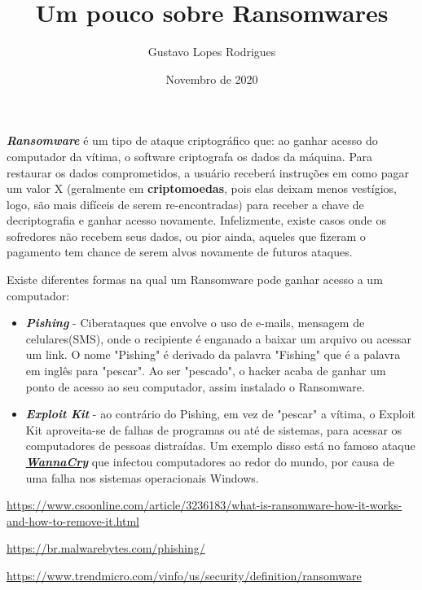 \documentclass[12pt]{article}
\title{\textbf{Um pouco sobre Ransomwares}}
\author{Gustavo Lopes Rodrigues}
\date{Novembro de 2020}
\begin{document}
    
    \maketitle

    \textbf{\emph{Ransomware}} é um tipo de ataque criptográfico
    que: ao ganhar acesso do computador da vítima, o software 
    criptografa os dados da máquina. Para restaurar os dados comprometidos,
    a usuário receberá instruções em como pagar um valor X
    (geralmente em \textbf{criptomoedas}, pois elas deixam menos 
    vestígios, logo, são mais difíceis de serem re-encontradas) 
    para receber a chave de decriptografia e ganhar acesso novamente. 
    Infelizmente, existe casos onde os sofredores não recebem seus dados, 
    ou pior ainda, aqueles que fizeram o pagamento tem chance de
    serem alvos novamente de futuros ataques.

    Existe diferentes formas na qual um Ransomware pode ganhar 
    acesso a um computador:

    \begin{itemize}
        \item \textbf{\emph{Pishing}} - Ciberataques que envolve
        o uso de e-mails, mensagem de celulares(SMS), onde o recipiente
        é enganado a baixar um arquivo ou acessar um link. O nome "Pishing" é 
        derivado da palavra "Fishing" que é a palavra em inglês para "pescar".
        Ao ser "pescado", o hacker acaba de ganhar um ponto de acesso ao seu 
        computador, assim instalado o Ransomware.
    
        \item \textbf{\emph{Exploit Kit}} - ao contrário do Pishing, em vez
        de "pescar" a vítima, o Exploit Kit aproveita-se de falhas de programas
        ou até de sistemas, para acessar os computadores de pessoas distraídas.
        Um exemplo disso está no famoso ataque \href{https://olhardigital.com.br/especial/wannacry/}{\textbf{\emph{WannaCry}}} 
        que infectou computadores ao redor do mundo, por causa de uma falha nos 
        sistemas operacionais Windows.
    \end{itemize}

    \begin{thebibliography}{3}
        
        \url{https://www.csoonline.com/article/3236183/what-is-ransomware-how-it-works-and-how-to-remove-it.html}
        
        \url{https://br.malwarebytes.com/phishing/}

        \url{https://www.trendmicro.com/vinfo/us/security/definition/ransomware}
        
    \end{thebibliography}
\end{document}
